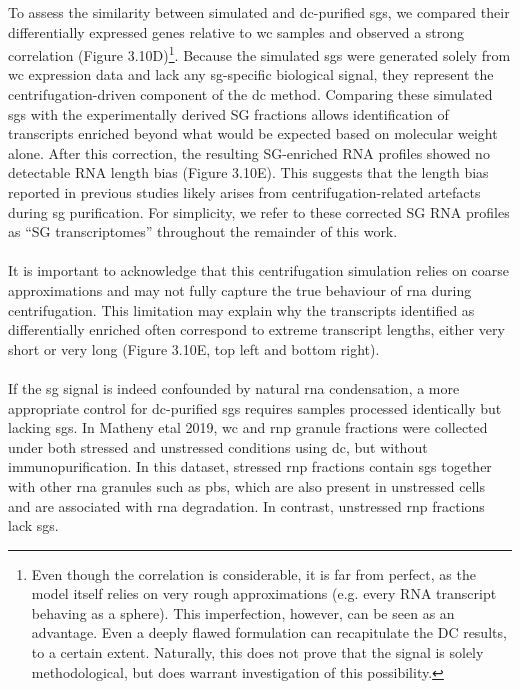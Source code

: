 To assess the similarity between simulated and \gls{dc}-purified \glspl{sg}, we compared their differentially expressed genes relative to \gls{wc} samples and observed a strong correlation (Figure 3.10D)\footnote{Even though the correlation is considerable, it is far from perfect, as the model itself relies on very rough approximations (e.g. every RNA transcript behaving as a sphere). This imperfection, however, can be seen as an advantage. Even a deeply flawed formulation can recapitulate the DC results, to a certain extent. Naturally, this does not prove that the signal is solely methodological, but does warrant investigation of this possibility.}. Because the simulated \glspl{sg} were generated solely from \gls{wc} expression data and lack any \gls{sg}-specific biological signal, they represent the centrifugation-driven component of the \gls{dc} method. Comparing these simulated \glspl{sg} with the experimentally derived SG fractions allows identification of transcripts enriched beyond what would be expected based on molecular weight alone. After this correction, the resulting SG-enriched RNA profiles showed no detectable RNA length bias (Figure 3.10E). This suggests that the length bias reported in previous studies likely arises from centrifugation-related artefacts during \gls{sg} purification. For simplicity, we refer to these corrected SG RNA profiles as ``SG transcriptomes” throughout the remainder of this work.
\\
\\
It is important to acknowledge that this centrifugation simulation relies on coarse approximations and may not fully capture the true behaviour of \gls{rna} during centrifugation. This limitation may explain why the transcripts identified as differentially enriched often correspond to extreme transcript lengths, either very short or very long (Figure 3.10E, top left and bottom right).
\\
\\
If the \gls{sg} signal is indeed confounded by natural \gls{rna} condensation, a more appropriate control for \gls{dc}-purified \glspl{sg} requires samples processed identically but lacking \glspl{sg}. In Matheny \gls{etal} 2019\cite{matheny_transcriptome-wide_2019}, \gls{wc} and \gls{rnp} granule fractions were collected under both stressed and unstressed conditions using \gls{dc}, but without immunopurification. In this dataset, stressed \gls{rnp} fractions contain \glspl{sg} together with other \gls{rna} granules such as \glspl{pb}, which are also present in unstressed cells and are associated with \gls{rna} degradation. In contrast, unstressed \gls{rnp} fractions lack \glspl{sg}.
